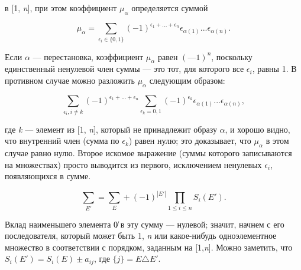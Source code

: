 \documentclass{mai_book}
\begin{document}

\noindent
[1, \textit{n}] в [1, \textit{n}], при этом коэффициент $\mu_\alpha$ определяется суммой

\begin{equation*}
\mu_{\alpha} = \sum_{\epsilon_i\in\{0,1\}} (-1)^{\epsilon_1+...+\epsilon_n} \epsilon_{\alpha(1)}...\epsilon_{\alpha(n)}.
\end{equation*}

\noindent
Если $\alpha$ — перестановка, коэффициент $\mu_\alpha$ равен $(—1)^n$, поскольку единственный ненулевой член суммы — это тот, для которого все $\epsilon_i$, равны 1. В противном случае можно разложить $\mu_\alpha$ следующим образом:

\begin{equation*}
\sum_{\epsilon_i, i \neq k} (-1)^{\epsilon_1+...+\epsilon_n} \sum_{\epsilon_k=0,1} (-1)^{\epsilon_k} \epsilon_{\alpha(1)}...\epsilon_{\alpha(n)},
\end{equation*}

\noindent
где \textit{k} — элемент из [1, \textit{n}], который не принадлежит образу $\alpha$, и хорошо видно, что внутренний член (сумма по $\epsilon_k$) равен нулю; это доказывает, что $\mu_\alpha$ в этом случае равно нулю. Второе искомое выражение (суммы которого записываются на множествах) просто выводится из первого, исключением ненулевых $\epsilon_i$, появляющихся в сумме.

\setcounter{equation}{6}

\begin{equation}
{\sum}_{E'} = {\sum}_E + (-1)^{|E'|} \prod_{1 \leq i \leq n} S_i (E').
\end{equation}

\noindent
Вклад наименьшего элемента 0̸  в эту сумму — нулевой; значит, начнем с его последователя, который может быть {1}, {\textit{n}} или какое-нибудь одноэлементное множество в соответствии с порядком, заданным на [1,\textit{n}]. Можно заметить, что $S_i(E') = S_i(E) \pm a_{ij}$, где $\{j\} = E \triangle E'$.
\end{document}
